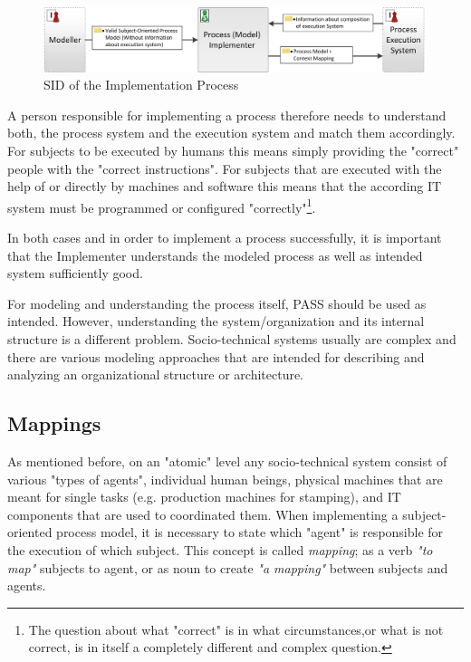 \begin{figure}[htbp]
	\centering
	\includegraphics[width=0.9\linewidth]{Figures/Implementation/ProcessImplementationSID.png}
	\caption[SID of the Process Model Implementation Process]{SID of the Implementation Process}
	\label{fig:ImplementationProcessSID}
\end{figure}

A person responsible for implementing a process therefore needs to understand both, the process system and the execution system and match them accordingly. For subjects to be executed by humans this means simply providing the "correct" people with the "correct instructions". For subjects that are executed with the help of or directly by machines and software this means that the according IT system must be programmed or configured "correctly"\footnote{The question about what "correct" is in what circumstances,or what  is not correct, is in itself a completely different and complex question.}. 

In both cases and in order to implement a process successfully, it is important that the Implementer understands the modeled process as well as intended system sufficiently good.  

For modeling and understanding the process itself, PASS should be used as intended. However, understanding the system/organization and its internal structure is a different problem. Socio-technical systems usually are complex and there are various modeling approaches that are intended for describing and analyzing an organizational structure or architecture.

\subsection{Mappings}

As mentioned before, on an "atomic" level any socio-technical system consist of various "types of agents", individual human beings, physical machines that are meant for single tasks (e.g. production machines for stamping), and IT components that are used to coordinated them. When implementing a subject-oriented process model, it is necessary to state which "agent" is responsible for the execution of which subject. This concept is called \textit{mapping}; as a verb \textit{"to map"} subjects to agent, or as noun to create \textit{"a mapping"} between subjects and agents.


